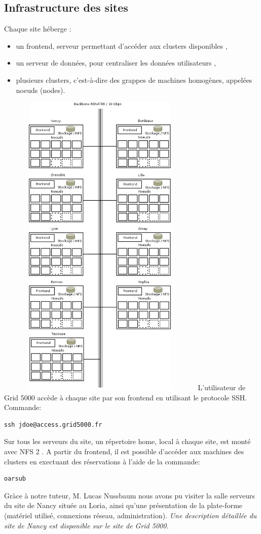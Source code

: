   \subsection{Infrastructure des sites}
Chaque site héberge :
\begin{itemize}
\item un frontend, serveur permettant d'accéder aux clusters disponibles ,
\item un serveur de données, pour centraliser les données utilisateurs ,
\item plusieurs clusters, c'est-à-dire des grappes de machines homogènes, appelées noeuds (nodes).
\end{itemize}
\includegraphics[width=10cm,height=15cm]{images/g5k1.png}
L'utilisateur de Grid 5000 accède à chaque site par son frontend en utilisant le protocole SSH.\\
Commande:
\begin{lstlisting}
ssh jdoe@access.grid5000.fr
\end{lstlisting}
Sur tous les serveurs du site, un répertoire home, local à chaque site, est monté avec NFS 2 .
A partir du frontend, il est possible d'accéder aux machines des clusters en exectuant des réservations à l'aide de la commande:
\begin{lstlisting}
oarsub
\end{lstlisting}
Gràce à notre tuteur, M. Lucas Nussbaum nous avons pu visiter la salle serveurs du site de Nancy située au Loria, 
ainsi qu'une présentation de la plate-forme (matériel utilisé, connexions réseau,
administration).
\quotation\textit{Une description détaillée du site de Nancy est disponible sur le site de Grid 5000.}

